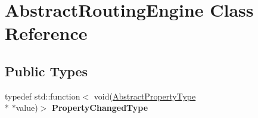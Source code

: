 \hypertarget{classAbstractRoutingEngine}{\section{Abstract\-Routing\-Engine Class Reference}
\label{classAbstractRoutingEngine}
}
\subsection*{Public Types}
\begin{DoxyCompactItemize}
\item 
\hypertarget{classAbstractRoutingEngine_aea584dbb4853b86a3020783bfe9e0608}{typedef std\-::function$<$ void(\hyperlink{classAbstractPropertyType}{Abstract\-Property\-Type} \\*
$\ast$value)$>$ {\bfseries Property\-Changed\-Type}}\label{classAbstractRoutingEngine_aea584dbb4853b86a3020783bfe9e0608}

\end{DoxyCompactItemize}
